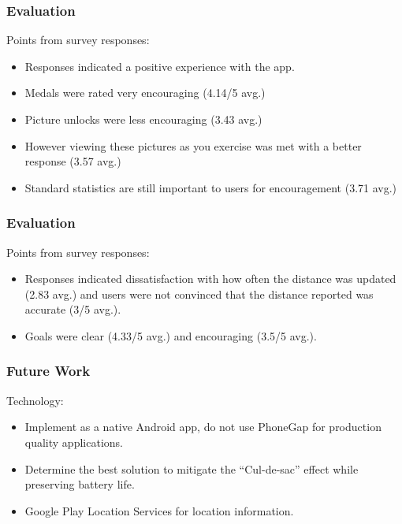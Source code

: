 \documentclass{beamer}
\begin{document}
\begin{frame}
  \frametitle{Evaluation}
  Points from survey responses:
  \begin{itemize}
    \item Responses indicated a positive experience with the app.
    \item Medals were rated very encouraging (4.14/5 avg.)
    \item Picture unlocks were less encouraging (3.43 avg.)
    \item However viewing these pictures as you exercise was met with
      a better response (3.57 avg.)
    \item Standard statistics are still important to users for
      encouragement (3.71 avg.)
  \end{itemize}
\end{frame}

\begin{frame}
  \frametitle{Evaluation}
  Points from survey responses:
  \begin{itemize}
    \item Responses indicated dissatisfaction with how often the
      distance was updated (2.83 avg.) and users were not convinced
      that the distance reported was accurate (3/5 avg.).
    \item Goals were clear (4.33/5 avg.) and encouraging (3.5/5 avg.).
  \end{itemize}
\end{frame}

\begin{frame}
  \frametitle{Future Work}
  Technology:
  \begin{itemize}
    \item Implement as a native Android app, do not use PhoneGap for
      production quality applications.
    \item Determine the best solution to mitigate the ``Cul-de-sac''
      effect while preserving battery life.
    \item Google Play Location Services for location information.
  \end{itemize}
\end{frame}
\end{document}
